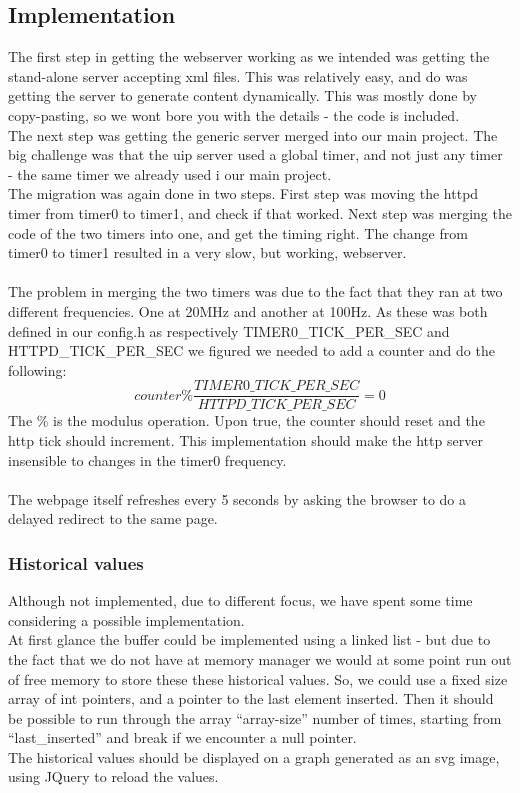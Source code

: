 {\subsection{Implementation}
The first step in getting the webserver working as we intended was getting the stand-alone server accepting xml files. This was relatively easy, and do was getting the server to generate content dynamically. This was mostly done by copy-pasting, so we wont bore you with the details - the code is included.\\
The next step was getting the generic server merged into our main project. The big challenge was that the uip server used a global timer, and not just any timer - the same timer we already used i our main project.\\
The migration was again done in two steps. First step was moving the httpd timer from timer0 to timer1, and check if that worked. Next step was merging the code of the two timers into one, and get the timing right. The change from timer0 to timer1 resulted in a very slow, but working, webserver.\\\\
The problem in merging the two timers was due to the fact that they ran at two different frequencies. One at 20MHz and another at 100Hz. As these was both defined in our config.h as respectively TIMER0\_TICK\_PER\_SEC and HTTPD\_TICK\_PER\_SEC we figured we needed to add a counter and do the following:
\begin{equation}
  counter \% \frac{TIMER0\_TICK\_PER\_SEC}{HTTPD\_TICK\_PER\_SEC} = 0
\end{equation}
The \% is the modulus operation. Upon true, the counter should reset and the http tick should increment. This implementation should make the http server insensible to changes in the timer0 frequency.\\\\
The webpage itself refreshes every 5 seconds by asking the browser to do a delayed redirect to the same page.

\subsubsection{Historical values}
Although not implemented, due to different focus, we have spent some time considering a possible implementation.\\
At first glance the buffer could be implemented using a linked list - but due to the fact that we do not have at memory manager we would at some point run out of free memory to store these these historical values. So, we could use a fixed size array of int pointers, and a pointer to the last element inserted. Then it should be possible to run through the array ``array-size'' number of times, starting from ``last\_inserted'' and break if we encounter a null pointer.\\
The historical values should be displayed on a graph generated as an svg image, using JQuery to reload the values.

}
